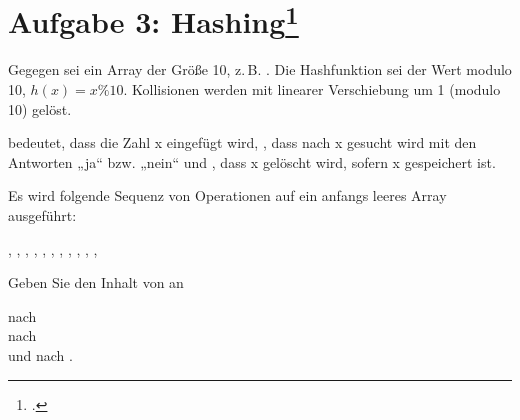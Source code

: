 \documentclass{lehramt-informatik}
\begin{document}
%

\section{Aufgabe 3: Hashing\footcite{examen:66115:2010:09}}

Gegegen sei ein Array der Größe 10, z.\,B. . Die Hashfunktion sei der Wert modulo 10, $h(x) = x \% 10$.
Kollisionen werden mit linearer Verschiebung um 1 (modulo 10) gelöst.

 bedeutet, dass die Zahl x eingefügt wird,
, dass nach x gesucht wird mit den Antworten „ja“ bzw. „nein“ und
, dass x gelöscht wird, sofern x gespeichert ist.

Es wird folgende Sequenz von Operationen auf ein anfangs leeres Array
ausgeführt:

,
,
,
,
,
,
,
,
,
,
,

Geben Sie den Inhalt von  an

nach \\
nach \\
und nach .

\literatur
\end{document}

